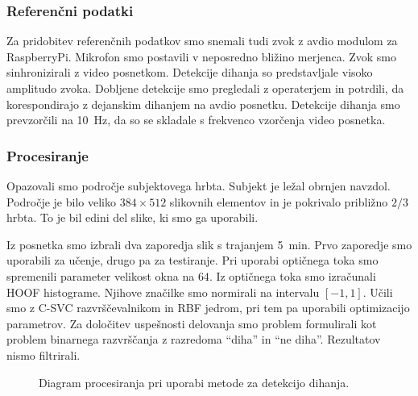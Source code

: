\subsubsection{Referenčni podatki}
Za pridobitev referenčnih podatkov smo snemali tudi zvok z avdio modulom za RaspberryPi. Mikrofon smo postavili v neposredno bližino merjenca. Zvok smo sinhronizirali z video posnetkom. Detekcije dihanja so predstavljale visoko amplitudo zvoka. Dobljene detekcije smo pregledali z operaterjem in potrdili, da korespondirajo z dejanskim dihanjem na avdio posnetku. Detekcije dihanja smo prevzorčili na \SI{10}{Hz}, da so se skladale s frekvenco vzorčenja video posnetka.

\subsubsection{Procesiranje}\label{sec:data-preprocessing}
Opazovali smo področje subjektovega hrbta. Subjekt je ležal obrnjen navzdol. Področje je bilo veliko $384 \times 512$ slikovnih elementov in je pokrivalo približno $2/3$ hrbta. To je bil edini del slike, ki smo ga uporabili.

Iz posnetka smo izbrali dva zaporedja slik s trajanjem \SI{5}{min}. Prvo zaporedje smo uporabili za učenje, drugo pa za testiranje. Pri uporabi optičnega toka smo spremenili parameter velikost okna na $64$. Iz optičnega toka smo izračunali HOOF histograme. Njihove značilke smo normirali na intervalu $[-1,1]$. Učili smo z C-SVC razvrščevalnikom in RBF jedrom, pri tem pa uporabili optimizacijo parametrov. Za določitev uspešnosti delovanja smo problem formulirali kot problem binarnega razvrščanja z razredoma ``diha'' in ``ne diha''. Rezultatov nismo filtrirali.

\begin{figure}[htb]
	\centering
	\resizebox{\columnwidth}{!}{}
	\caption[Diagram procesiranja pri uporabi metode za detekcijo dihanja]{Diagram procesiranja pri uporabi metode za detekcijo dihanja.}
	\label{fig:dihanje-postopek}
\end{figure}

